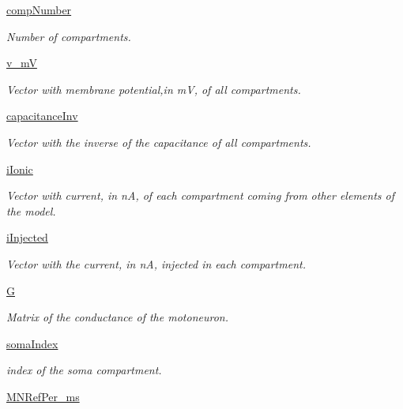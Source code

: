 \begin{DoxyCompactItemize}
\hyperlink{class_motor_unit_1_1_motor_unit_afe7281fb12c41102980b6b48d5a49713}{comp\+Number}
\begin{DoxyCompactList}\small\item\em Number of compartments. \end{DoxyCompactList}\item 
\hyperlink{class_motor_unit_1_1_motor_unit_aa8968f89250895ae2ae572e9106709f2}{v\+\_\+mV}
\begin{DoxyCompactList}\small\item\em Vector with membrane potential,in mV, of all compartments. \end{DoxyCompactList}\item 
\hyperlink{class_motor_unit_1_1_motor_unit_a0cf2afb5bd12374db56b9d9a5a1671e6}{capacitance\+Inv}
\begin{DoxyCompactList}\small\item\em Vector with the inverse of the capacitance of all compartments. \end{DoxyCompactList}\item 
\hyperlink{class_motor_unit_1_1_motor_unit_a0541858216e7d01582312f9a7a99d595}{i\+Ionic}
\begin{DoxyCompactList}\small\item\em Vector with current, in nA, of each compartment coming from other elements of the model. \end{DoxyCompactList}\item 
\hyperlink{class_motor_unit_1_1_motor_unit_a06045eca379d38892670a491dbac0829}{i\+Injected}
\begin{DoxyCompactList}\small\item\em Vector with the current, in nA, injected in each compartment. \end{DoxyCompactList}\item 
\hyperlink{class_motor_unit_1_1_motor_unit_a9b9f157ab92b47470ca7ec6bd3473dd3}{G}
\begin{DoxyCompactList}\small\item\em Matrix of the conductance of the motoneuron. \end{DoxyCompactList}\item 
\hyperlink{class_motor_unit_1_1_motor_unit_a7cd2be92814b5892bdd18dafd824da9f}{soma\+Index}
\begin{DoxyCompactList}\small\item\em index of the soma compartment. \end{DoxyCompactList}\item 
\hyperlink{class_motor_unit_1_1_motor_unit_abbdaa195ac00926d96d509ae01dcda05}{M\+N\+Ref\+Per\+\_\+ms}

\end{DoxyCompactItemize}
